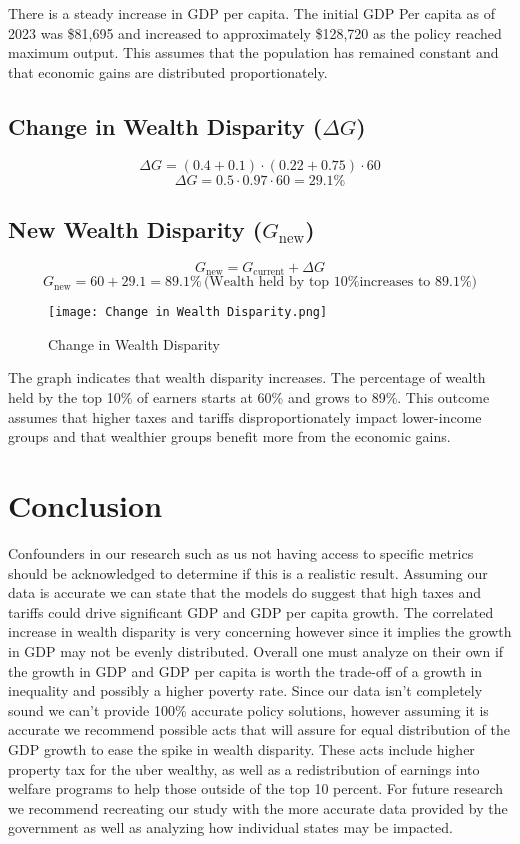 \documentclass[12pt,letterpaper]{article}
\begin{document}
\indent There is a steady increase in GDP per capita. The initial GDP Per capita as of 2023 was \$81,695 and increased to approximately \$128,720 as the policy reached maximum output. This assumes that the population has remained constant and that economic gains are distributed proportionately. 

\subsection*{Change in Wealth Disparity (\( \Delta G \))}
\[
\Delta G = (0.4 + 0.1) \cdot (0.22 + 0.75) \cdot 60
\]
\[
\Delta G = 0.5 \cdot 0.97 \cdot 60 = 29.1\%
\]

\subsection*{New Wealth Disparity (\( G_{\text{new}} \))}

\[
G_{\text{new}} = G_{\text{current}} + \Delta G
\]
\[
G_{\text{new}} = 60 + 29.1 = 89.1\% \, \text{(Wealth held by top 10\% increases to 89.1\%)}
\]
\begin{figure}[ht]
    \centering
    \texttt{[image: Change in Wealth Disparity.png]}
    \caption{Change in Wealth Disparity}
    \label{fig:3}
\end{figure}

\indent The graph indicates that wealth disparity increases. The percentage of wealth held by the top 10\% of earners starts at 60\% and grows to 89\%. This outcome assumes that higher taxes and tariffs disproportionately impact lower-income groups and that wealthier groups benefit more from the economic gains.

\section{Conclusion}

\indent Confounders in our research such as us not having access to specific metrics should be acknowledged to determine if this is a realistic result. Assuming our data is accurate we can state that the models do suggest that high taxes and tariffs could drive significant GDP and GDP per capita growth. The correlated increase in wealth disparity is very concerning however since it implies the growth in GDP may not be evenly distributed. Overall one must analyze on their own if the growth in GDP and GDP per capita is worth the trade-off of a growth in inequality and possibly a higher poverty rate. Since our data isn't completely sound we can't provide 100\% accurate policy solutions, however assuming it is accurate we recommend possible acts that will assure for equal distribution of the GDP growth to ease the spike in wealth disparity. These acts include higher property tax for the uber wealthy, as well as a redistribution of earnings into welfare programs to help those outside of the top 10 percent. For future research we recommend recreating our study with the more accurate data provided by the government as well as analyzing how individual states may be impacted.
\end{document}
